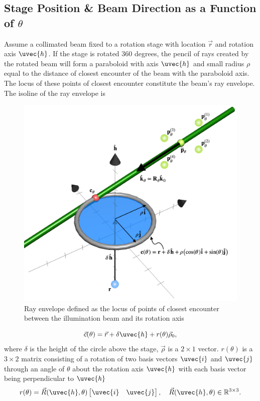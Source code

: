 \subsection{Stage Position \& Beam Direction as a Function of $\theta$}
Assume a collimated beam fixed to a rotation stage with location $\vec{r}$ and rotation axis $\uvec{h}$. If the stage is rotated 360 degrees, the pencil of rays created by the rotated beam will form a paraboloid with axis $\uvec{h}$ and small radius $\rho$ equal to the distance of closest encounter of the beam with the paraboloid axis. The locus of these points of closest encounter constitute the beam's ray envelope. The isoline of the ray envelope is
%
\begin{figure}
    \centering
    \includegraphics[width=0.5\linewidth]{figures/ray_envelope.png}
    \caption{Ray envelope defined as the locus of points of closest encounter between the illumination beam and its rotation axis}
    \label{fig:ray_envelope_geometry}
\end{figure}
%
\begin{equation}
    \vec{c}(\theta) = \vec{r} + \delta \uvec{h} + r(\theta) \vec{\rho}_0,
    \label{eqn:section}
\end{equation}
%
where $\delta$ is the height of the circle above the stage, $\vec{\rho}$ is a $2 \times 1$ vector. $r(\theta)$ is a $3 \times 2$ matrix consisting of a rotation of two basis vectors $\uvec{i}$ and $\uvec{j}$ through an angle of $\theta$ about the rotation axis $\uvec{h}$ with each basis vector being perpendicular to $\uvec{h}$
%
\begin{equation}
    r(\theta) = \vec{R}(\uvec{h}, \theta) \begin{bmatrix}
        \uvec{i} & \uvec{j}
    \end{bmatrix},
    \quad \vec{R}(\uvec{h}, \theta) \in \mathbb{R}^{3 \times 3}.
\end{equation}

